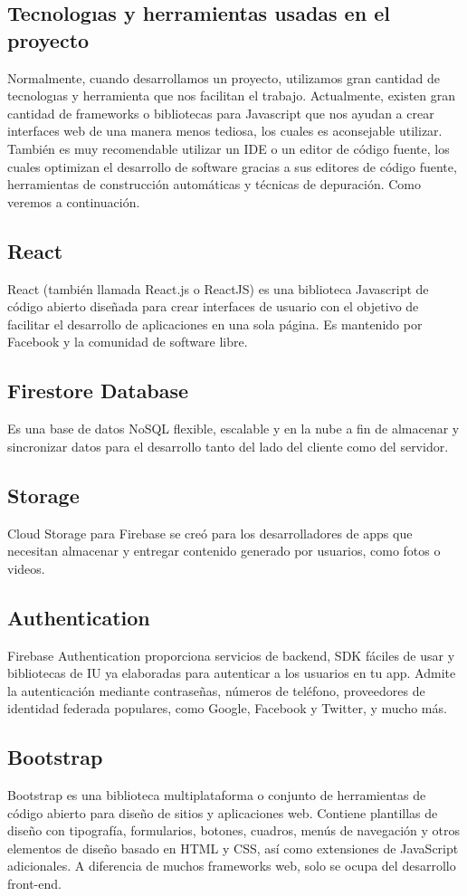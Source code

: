\documentclass[60pt]{article}
\begin{document}
\subsection{Tecnologıas y herramientas usadas en el proyecto}
Normalmente, cuando desarrollamos un proyecto, utilizamos
gran cantidad de tecnologıas y herramienta que nos facilitan el trabajo. Actualmente, existen
gran cantidad de frameworks o bibliotecas para Javascript que nos ayudan a crear interfaces web
de una manera menos tediosa, los cuales es aconsejable utilizar. También es muy recomendable
utilizar un IDE o un editor de código fuente, los cuales optimizan el desarrollo de software
gracias a sus editores de código fuente, herramientas de construcción automáticas y técnicas de
depuración. Como veremos a continuación.
\subsection{React}
React (también llamada React.js o ReactJS) es una biblioteca Javascript de código abierto diseñada para crear interfaces de usuario con el objetivo de facilitar el desarrollo de aplicaciones en una sola página. Es mantenido por Facebook y la comunidad de software libre.
\subsection{Firestore Database}
Es una base de datos NoSQL flexible, escalable y en la nube a fin de almacenar y sincronizar datos para el desarrollo tanto del lado del cliente como del servidor.
\subsection{Storage}
Cloud Storage para Firebase se creó para los desarrolladores de apps que necesitan almacenar y entregar contenido generado por usuarios, como fotos o videos.
\subsection{Authentication}
Firebase Authentication proporciona servicios de backend, SDK fáciles de usar y bibliotecas de IU ya elaboradas para autenticar a los usuarios en tu app. Admite la autenticación mediante contraseñas, números de teléfono, proveedores de identidad federada populares, como Google, Facebook y Twitter, y mucho más.
\subsection{Bootstrap}
Bootstrap es una biblioteca multiplataforma o conjunto de herramientas de código abierto para diseño de sitios y aplicaciones web. Contiene plantillas de diseño con tipografía, formularios, botones, cuadros, menús de navegación y otros elementos de diseño basado en HTML y CSS, así como extensiones de JavaScript adicionales. A diferencia de muchos frameworks web, solo se ocupa del desarrollo front-end.
\end{document}
